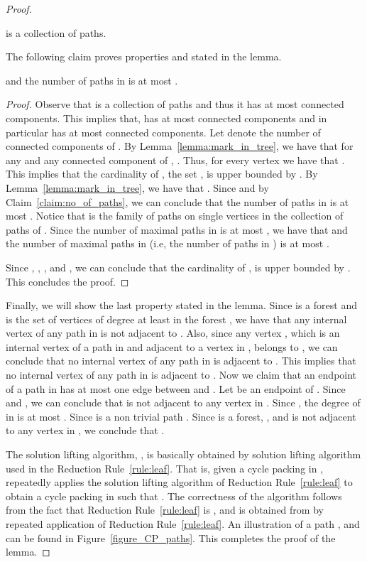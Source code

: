 \begin{proof}
\begin{claim}
 \label{claim:no_of_paths}
  is a collection of  paths. 
\end{claim}
The following claim proves properties  and  stated in the lemma. 
\begin{claim}
\label{claim:CPboundR}
 and the number of paths in  is at most  . 
\end{claim}
\begin{proof}
Observe that  is a 
collection of  paths and thus it has at most   connected components. This implies that,  has at most   connected components and in particular  has at most   connected components. 
Let  denote the number of connected components of . 
By Lemma~\ref{lemma:mark_in_tree}, we have that 
for any  and any connected component  of , 
.  Thus, for every vertex   we have that 
. 
This
implies that the cardinality of , the set ,  
is upper bounded by .  
By Lemma~\ref{lemma:mark_in_tree}, we have that . 
Since  and by Claim~\ref{claim:no_of_paths}, we can conclude 
that the number of paths in  is at most . 
Notice that  is the family of paths on single vertices in the collection of paths of 
. 
Since the number of maximal paths in  is at most , 
we have that  and 
the number of maximal paths in  (i.e, the 
number of paths in ) is at most . 

Since , , ,  and , we can conclude that the cardinality of 
, is upper bounded by . This concludes the proof. 
\end{proof}
Finally, we will show the last property stated in the lemma. 
Since  is a forest and  is the set of vertices of degree at least  in the forest , 
we have that  any internal vertex of any path in  is not adjacent to . 
Also, since any vertex , which is an internal vertex of a path in  and 
adjacent to a vertex in , belongs to , we can conclude that no internal vertex of any path in  is adjacent to 
. This implies that  
no internal vertex of any path in  is adjacent to 
.  
Now we claim that an endpoint  of a path  in  has at most 
one edge between  and . 
Let  be an endpoint of . 
Since   and , we can conclude that  is not adjacent to 
any vertex in . 
Since , the degree of 
 in  is at most . Since  is a non trivial path . 
Since  is a forest, , and  is not adjacent to any vertex in , 
we conclude that .  

The solution lifting algorithm, ,  is basically obtained by solution lifting algorithm 
used in the Reduction Rule~\ref{rule:leaf}. That is,   given a cycle packing  in ,   
repeatedly applies the solution lifting algorithm of  Reduction Rule~\ref{rule:leaf} to obtain a cycle packing  in  such that . The correctness of the algorithm  follows 
from the fact that Reduction Rule~\ref{rule:leaf} is \onesafe, 
and  is obtained from  by repeated application of 
Reduction Rule~\ref{rule:leaf}.  
An illustration of a path ,  and  can be found in Figure~\ref{figure_CP_paths}. 
This completes the proof of the lemma. 
\end{proof}


